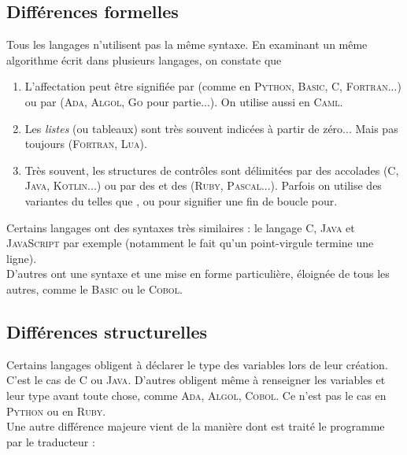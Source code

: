 \documentclass[a4paper,12pt,french]{book}
\begin{document}
\subsection*{Différences formelles}

Tous les langages n'utilisent pas la même syntaxe. En examinant un même algorithme écrit dans plusieurs langages, on constate que 

\begin{enumerate}[\textbullet]
	\item 	L'affectation peut être signifiée par \tw{=} (comme en \textsc{Python}, \textsc{Basic}, \textsc{C}, \textsc{Fortran}...) ou par \tw{:=} (\textsc{Ada}, \textsc{Algol}, \textsc{Go} pour partie...). On utilise aussi \tw{<-} en \textsc{Caml}.
	\item 	Les \textit{listes} (ou tableaux) sont très souvent indicées à partir de zéro... Mais pas toujours (\textsc{Fortran}, \textsc{Lua}).
	\item 	Très souvent, les structures de contrôles sont délimitées par des accolades (\textsc{C}, \textsc{Java},  \textsc{Kotlin}...) ou par des  et des  (\textsc{Ruby}, \textsc{Pascal}...). Parfois on utilise des variantes du  telles que ,  ou  pour signifier une fin de boucle \og pour\fg{}.
\end{enumerate}

Certains langages ont des syntaxes très similaires : le langage \textsc{C}, \textsc{Java} et \textsc{JavaScript} par exemple (notamment le fait qu'un point-virgule termine une ligne).\\
D'autres ont une syntaxe et une mise en forme particulière, éloignée de tous les autres, comme le \textsc{Basic} ou le \textsc{Cobol}.

\subsection*{Différences structurelles}

Certains langages obligent à déclarer le type des variables lors de leur création. C'est le cas de \textsc{C} ou \textsc{Java}. D'autres obligent même à renseigner les variables et leur type avant toute chose, comme \textsc{Ada}, \textsc{Algol}, \textsc{Cobol}. Ce n'est pas le cas en \textsc{Python} ou en \textsc{Ruby}.\\

Une autre différence majeure vient de la manière dont est traité le programme par le traducteur :
\end{document}
